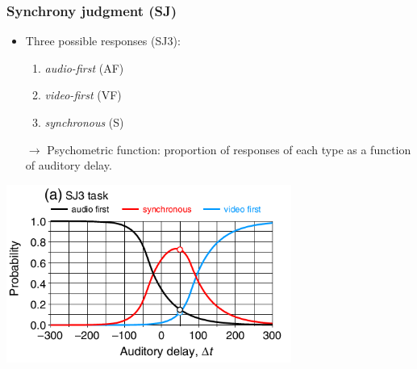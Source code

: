 \documentclass[xcolor={fixpdftex,hyperref,x11names},10pt,pdftex,hyperref={pdftex}]{beamer}
\begin{document}
\begin{frame}
    \frametitle{Synchrony judgment (SJ)}

    \begin{itemize}
        \item Three possible responses (SJ3):
            \begin{enumerate}
                \item \textit{audio-first} (AF)
                \item \textit{video-first} (VF)
                \item \textit{synchronous} (S)
            \end{enumerate}

        \item[$\rightarrow$] Psychometric function: proportion of responses of
         each type as a function of auditory delay.

    \end{itemize}


    \begin{center}
        \includegraphics[width=0.7\textwidth]{figs/SJ3-psychometric-function.png}
    \end{center}
\end{frame}




\end{document}
